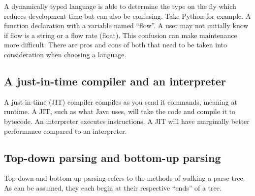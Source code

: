 \documentclass{article}
\begin{document}
A dynamically typed language is able to determine the type on the fly which reduces development time but can also be confusing. Take Python for example. A function declaration with a variable named ``flow''. A user may not initially know if flow is a string or a flow rate (float). This confusion can make maintenance more difficult. There are pros and cons of both that need to be taken into consideration when choosing a language.

\subsection{A just-in-time compiler and an interpreter}
A just-in-time (JIT) compiler compiles as you send it commands, meaning at runtime. A JIT, such as what Java uses, will take the code and compile it to bytecode. An interpreter executes instructions. A JIT will have marginally better performance compared to an interpreter.

\subsection{Top-down parsing and bottom-up parsing}
Top-down and bottom-up parsing refers to the methods of walking a parse tree. As can be assumed, they each begin at their respective ``ends'' of a tree. 
\end{document}
